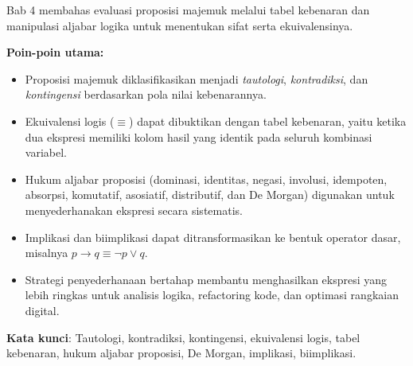\documentclass[../main]{subfiles}
\begin{document}

\begin{rangkuman}
Bab 4 membahas evaluasi proposisi majemuk melalui tabel kebenaran dan manipulasi aljabar logika untuk menentukan sifat serta ekuivalensinya.

\textbf{Poin-poin utama:}
\begin{itemize}
  \item Proposisi majemuk diklasifikasikan menjadi \textit{tautologi}, \textit{kontradiksi}, dan \textit{kontingensi} berdasarkan pola nilai kebenarannya.
  \item Ekuivalensi logis ($\equiv$) dapat dibuktikan dengan tabel kebenaran, yaitu ketika dua ekspresi memiliki kolom hasil yang identik pada seluruh kombinasi variabel.
  \item Hukum aljabar proposisi (dominasi, identitas, negasi, involusi, idempoten, absorpsi, komutatif, asosiatif, distributif, dan De Morgan) digunakan untuk menyederhanakan ekspresi secara sistematis.
  \item Implikasi dan biimplikasi dapat ditransformasikan ke bentuk operator dasar, misalnya $p \rightarrow q \equiv \neg p \vee q$.
  \item Strategi penyederhanaan bertahap membantu menghasilkan ekspresi yang lebih ringkas untuk analisis logika, refactoring kode, dan optimasi rangkaian digital.
\end{itemize}

\textbf{Kata kunci}: Tautologi, kontradiksi, kontingensi, ekuivalensi logis, tabel kebenaran, hukum aljabar proposisi, De Morgan, implikasi, biimplikasi.
\end{rangkuman}

\ifSubfilesClassLoaded{
  \renewcommand{\bibname}{Daftar Pustaka}
  
  
}{}
\end{document}
